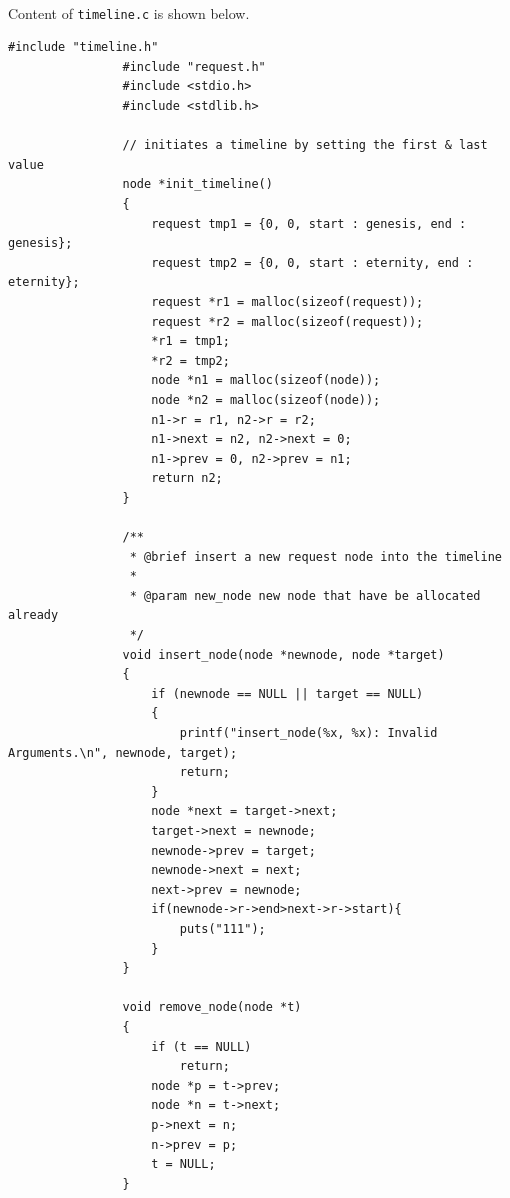 \documentclass{article}
\begin{document}
            \paragraph{}
                Content of \texttt{timeline.c} is shown below.
            \begin{Verbatim}[gobble=8]
                #include "timeline.h"
                #include "request.h"
                #include <stdio.h>
                #include <stdlib.h>
                
                // initiates a timeline by setting the first & last value
                node *init_timeline()
                {
                    request tmp1 = {0, 0, start : genesis, end : genesis};
                    request tmp2 = {0, 0, start : eternity, end : eternity};
                    request *r1 = malloc(sizeof(request));
                    request *r2 = malloc(sizeof(request));
                    *r1 = tmp1;
                    *r2 = tmp2;
                    node *n1 = malloc(sizeof(node));
                    node *n2 = malloc(sizeof(node));
                    n1->r = r1, n2->r = r2;
                    n1->next = n2, n2->next = 0;
                    n1->prev = 0, n2->prev = n1;
                    return n2;
                }
                
                /**
                 * @brief insert a new request node into the timeline
                 * 
                 * @param new_node new node that have be allocated already
                 */
                void insert_node(node *newnode, node *target)
                {
                    if (newnode == NULL || target == NULL)
                    {
                        printf("insert_node(%x, %x): Invalid Arguments.\n", newnode, target);
                        return;
                    }
                    node *next = target->next;
                    target->next = newnode;
                    newnode->prev = target;
                    newnode->next = next;
                    next->prev = newnode;
                    if(newnode->r->end>next->r->start){
                        puts("111");
                    }
                }
                
                void remove_node(node *t)
                {
                    if (t == NULL)
                        return;
                    node *p = t->prev;
                    node *n = t->next;
                    p->next = n;
                    n->prev = p;
                    t = NULL;
                }
                

\end{Verbatim}
\end{document}
